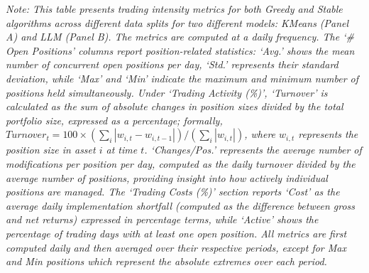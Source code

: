 \begin{table}[htbp]
\vspace{0.5cm}
\begin{minipage}{\textwidth}
\setlength{\parindent}{0pt}
\small\textit{Note: 
This table presents trading intensity metrics for both Greedy and Stable algorithms across different data splits for two different models: KMeans (Panel A) and LLM (Panel B). 
The metrics are computed at a daily frequency. The `\# Open Positions' columns report position-related statistics: 
`Avg.' shows the mean number of concurrent open positions per day, `Std.' represents their standard deviation, while 
`Max' and `Min' indicate the maximum and minimum number of positions held simultaneously. Under `Trading Activity (\%)', 
`Turnover' is calculated as the sum of absolute changes in position sizes divided by the total portfolio size, expressed 
as a percentage; formally, $Turnover_t = 100 \times (\sum_i |w_{i,t} - w_{i,t-1}|)/(\sum_i |w_{i,t}|)$, where $w_{i,t}$ 
represents the position size in asset $i$ at time $t$. `Changes/Pos.' represents the average number of modifications per 
position per day, computed as the daily turnover divided by the average number of positions, providing insight into how 
actively individual positions are managed. The `Trading Costs (\%)' section reports `Cost' as the average daily implementation 
shortfall (computed as the difference between gross and net returns) expressed in percentage terms, while `Active' shows 
the percentage of trading days with at least one open position. All metrics are first computed daily and then averaged 
over their respective periods, except for Max and Min positions which represent the absolute extremes over each period.
}
\end{minipage}
\end{table}